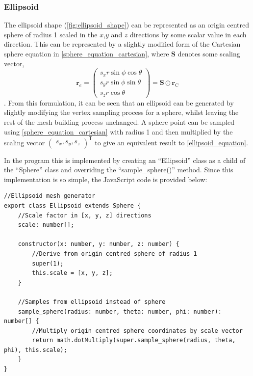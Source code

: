 
\subsubsection{Ellipsoid}
The ellipsoid shape (\cref{fig:ellipsoid_shape}) can be represented as an origin centred sphere of radius 1 scaled in the $x$,$y$ and $z$ directions by some scalar value in each direction. This can be represented by a slightly modified form of the Cartesian sphere equation in \cref{sphere_equation_cartesian}, where $\mathbf{S}$ denotes some scaling vector,
\begin{equation}
\mathbf{r}_{e}=\begin{pmatrix}s_x r\sin\phi \cos\theta\\
s_y r\sin\phi \sin\theta\\
s_z r\cos\theta\end{pmatrix}
=\mathbf{S} \odot \mathbf{r}_\mathrm{C}
\label{ellipsoid_equation}
\end{equation}.
From this formulation, it can be seen that an ellipsoid can be generated by slightly modifying the vertex sampling process for a sphere, whilst leaving the rest of the mesh building process unchanged. A sphere point can be sampled using \cref{sphere_equation_cartesian} with radius 1 and then multiplied by the scaling vector $\begin{pmatrix}s_x,s_y,s_z\end{pmatrix}^\mathsf{T}$ to give an equivalent result to \cref{ellipsoid_equation}.

In the program this is implemented by creating an ``Ellipsoid'' class as a child of the ``Sphere'' class and overriding the ``sample\_sphere()'' method. Since this implementation is so simple, the JavaScript code is provided below:

\begin{adjustbox}{width=\textwidth}
\begin{lstlisting}
//Ellipsoid mesh generator
export class Ellipsoid extends Sphere {
    //Scale factor in [x, y, z] directions
    scale: number[];

    constructor(x: number, y: number, z: number) {
        //Derive from origin centred sphere of radius 1
        super(1);
        this.scale = [x, y, z];
    }

    //Samples from ellipsoid instead of sphere
    sample_sphere(radius: number, theta: number, phi: number): number[] {
        //Multiply origin centred sphere coordinates by scale vector
        return math.dotMultiply(super.sample_sphere(radius, theta, phi), this.scale);
    }
}
\end{lstlisting}
\end{adjustbox}

